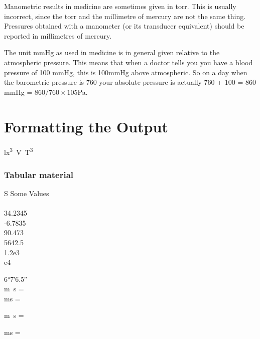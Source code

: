 \documentclass{tufte-book}
\begin{document}
Manometric results in medicine are sometimes given in torr.
This is usually incorrect, since the torr and the millimetre of mercury are not the same thing.
Pressures obtained with a manometer (or its transducer equivalent) should be reported in millimetres of mercury.

The unit mmHg as used in medicine is in general given relative to the atmospheric pressure. This means that when a doctor tells you you have a blood pressure of 100 mmHg, this is 100mmHg above atmospheric. So on a day when the barometric pressure is 760 your absolute pressure is actually 760 + 100 = 860 mmHg = $860/760\times105$Pa. 




\chapter{Formatting the Output}

\si{\cubic\lux\volt\tesla\cubed}
\subsection{Tabular material}

\begin{table}
\caption{Standard behaviour of the \texttt{S} column type.}
\label{tab:S:standard}
\centering
\begin{tabular}{S}
\toprule
{Some Values} \\
 \\
34.2345 \\
-6.7835 \\
90.473 \\
5642.5 \\
1.2e3 \\
e4 \\
\bottomrule
\end{tabular}
\end{table}

\ang{6;7;6.5} \\

 \si{\metre\second} =   \\
 \si{\milli\second} =   \\


 \si{\metre\second} =  

 \si{\milli\second} =  
\end{document}
